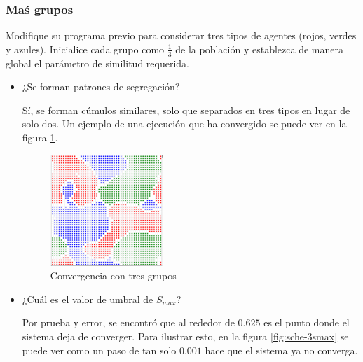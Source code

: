 \documentclass{article}
\begin{document}
\subsubsection{Maś grupos}

Modifique su programa previo para considerar tres tipos de agentes (rojos,
verdes y azules). Inicialice cada grupo como $\frac{1}{3}$ de la población y
establezca de manera global el parámetro de similitud requerida.

\begin{itemize}
  \item ¿Se forman patrones de segregación?

    Sí, se forman cúmulos similares, solo que separados en tres tipos en lugar
    de solo dos. Un ejemplo de una ejecución que ha convergido se puede ver en
    la figura \ref{fig:sche-conv3}.

    \begin{figure}
      \centering
      \includegraphics[width=0.4\textwidth]{imgs/3conv.png}
      \caption{Convergencia con tres grupos}
      \label{fig:sche-conv3}
    \end{figure}
  \item ¿Cuál es el valor de umbral de $S_{max}$?

    Por prueba y error, se encontró que al rededor de $0.625$ es el punto donde
    el sistema deja de converger. Para ilustrar esto, en la figura
    \ref{fig:sche-3smax} se puede ver como un paso de tan solo $0.001$ hace que
    el sistema ya no converga.


\end{itemize}
\end{document}
